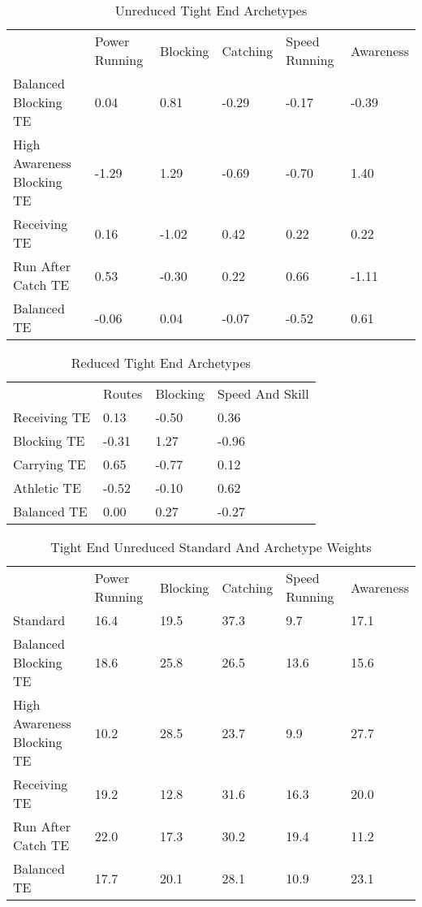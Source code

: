 \documentclass[11pt]{article}
\begin{document}
\begin{table}[]
\centering
\caption{Unreduced Tight End Archetypes}
\label{UnreducedTightEnd}
\begin{tabular}{llllll}
                           & Power Running & Blocking & Catching & Speed Running & Awareness \\
Balanced Blocking TE       & 0.04          & 0.81     & -0.29    & -0.17         & -0.39     \\
High Awareness Blocking TE & -1.29         & 1.29     & -0.69    & -0.70         & 1.40      \\
Receiving TE               & 0.16          & -1.02    & 0.42     & 0.22          & 0.22      \\
Run After Catch TE         & 0.53          & -0.30    & 0.22     & 0.66          & -1.11     \\
Balanced TE                & -0.06         & 0.04     & -0.07    & -0.52         & 0.61     
\end{tabular}
\end{table}

\begin{table}[]
\centering
\caption{Reduced Tight End Archetypes}
\label{ReducedTightEnd}
\begin{tabular}{llll}
             & Routes & Blocking & Speed And Skill \\
Receiving TE & 0.13   & -0.50    & 0.36            \\
Blocking TE  & -0.31  & 1.27     & -0.96           \\
Carrying TE  & 0.65   & -0.77    & 0.12            \\
Athletic TE  & -0.52  & -0.10    & 0.62            \\
Balanced TE  & 0.00   & 0.27     & -0.27          
\end{tabular}
\end{table}

\begin{table}[]
\centering
\caption{Tight End Unreduced Standard And Archetype Weights}
\label{TightEndUnreducedWeights}
\begin{tabular}{llllll}
                           & Power Running & Blocking & Catching & Speed Running & Awareness \\
Standard                   & 16.4          & 19.5     & 37.3     & 9.7           & 17.1      \\
Balanced Blocking TE       & 18.6          & 25.8     & 26.5     & 13.6          & 15.6      \\
High Awareness Blocking TE & 10.2          & 28.5     & 23.7     & 9.9           & 27.7      \\
Receiving TE               & 19.2          & 12.8     & 31.6     & 16.3          & 20.0      \\
Run After Catch TE         & 22.0          & 17.3     & 30.2     & 19.4          & 11.2      \\
Balanced TE                & 17.7          & 20.1     & 28.1     & 10.9          & 23.1     
\end{tabular}
\end{table}
\end{document}
